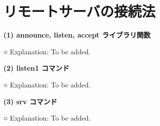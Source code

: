 \begin{comment}
    以上の設定により、{\tt Chan(m/n)}は、サーバ内のマウント開始位置オブジェクト
    の{\bf 代行(Proxy)オブジェクト}となる。\\
    こうして、{\tt Chan(m/n)}への操作は、 
    Mntサーバント (devmnt.c) の呼び出しとなる。
    Mntサーバントは、要求を {\bf 9P メッセージ}に変換してサーバリンクに送り出し、
   サーバからの返答を受けたら、それをクライアントに返す。


\item  サーバ名前空間での change directory \\
   例えば {\tt /m/n} から Change directory ``{\tt cd c/d}'' したとする。
   この場合は、 サーバとの間で {\tt walk}メッセージなどをやり取りして、
   全てが正当だったら、
   ``{\tt Chan(m/n/a/b)}'' テーブルを割り当て、以下の設定を行う。
  \begin{itemize}
    \item Chan.type フィールドには Mntサーバント (devmnt.c) の識別番号を設定。
    \item Chan.mchan フィールドには {\tt Chan(サーバリンク)}を設定
    \item Chan.qid フィールドには サーバからもらった{\tt qid}を設定。
          この{\tt qid}は、サーバ内の{\tt /b/c/d}オブジェクトの{\tt qid}である。
  \end{itemize}

    以上の設定により、{\tt Chan(m/n/c/d)}は、サーバ内の{\tt /b/c/d}オブジェクト
    の{\bf 代行(Proxy)オブジェクト}となる。\\

\end{enumerate}
\end{comment}

\section{リモートサーバの接続法}

{\bf\flushleft (1) announce, listen, accept ライブラリ関数}

○  Explanation: To be added.

\vspace{4cm}


{\bf\flushleft (2) listen1 コマンド}

○  Explanation: To be added.

\vspace{4cm}


{\bf\flushleft (3) srv コマンド}

○  Explanation: To be added.

